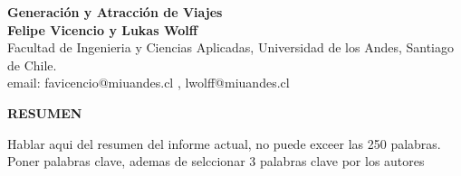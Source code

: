 \documentclass[12pt]{article} %
\begin{document}
\begin{titlepage}%
\newcommand{\HRule}{\rule{\linewidth}{0.5mm}} 
\center 
\begin{center}
    \textbf{\LARGE Generación y Atracción de Viajes} \\[0.5cm]
    \textbf{Felipe Vicencio y Lukas Wolff} \\
    Facultad de Ingenieria y Ciencias Aplicadas, Universidad de los Andes, Santiago de Chile.\\
    email: favicencio@miuandes.cl , lwolff@miuandes.cl
\end{center}

\vspace{1cm}

\begin{center}
    \textbf{\large RESUMEN}    
\end{center}

\begin{flushleft}
    Hablar aqui del resumen del informe actual, no puede exceer las 250 palabras. Poner palabras clave, ademas de selccionar 3 palabras clave por los autores
\end{flushleft}


\vspace{1cm}

\end{titlepage}

\end{document}
